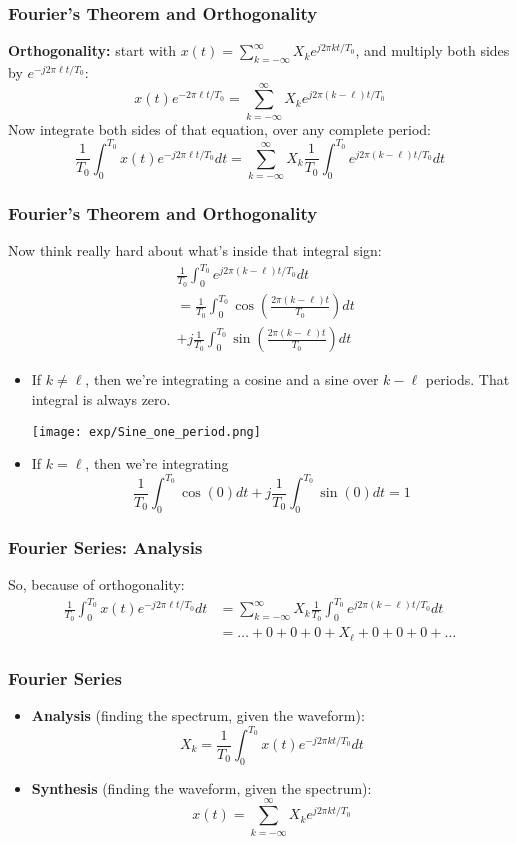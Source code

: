 \documentclass{beamer}
\begin{document}
\begin{frame}
  \frametitle{Fourier's Theorem and Orthogonality}

  {\bf Orthogonality:} start with $x(t) = \sum_{k=-\infty}^\infty X_k
  e^{j2\pi kt/T_0}$, and multiply both sides by $e^{-j2\pi \ell
    t/T_0}$:
  \[
  x(t)e^{-2\pi\ell t/T_0} = \sum_{k=-\infty}^\infty X_k e^{j2\pi (k-\ell)t/T_0}
  \]
  Now integrate both sides of that equation, over any complete period:
  \[
  \frac{1}{T_0}\int_0^{T_0}x(t)e^{-j2\pi\ell t/T_0}dt =
  \sum_{k=-\infty}^\infty X_k \frac{1}{T_0}\int_0^{T_0} e^{j2\pi (k-\ell)t/T_0}dt
  \]
\end{frame}

\begin{frame}
  \frametitle{Fourier's Theorem and Orthogonality}

  Now think really hard about what's inside that integral sign:
  \begin{align*}
    &\frac{1}{T_0}\int_0^{T_0} e^{j2\pi (k-\ell)t/T_0}dt\\
    &=\frac{1}{T_0}\int_0^{T_0}\cos\left(\frac{2\pi(k-\ell)t}{T_0}\right)dt\\
    &+j\frac{1}{T_0}\int_0^{T_0}\sin\left(\frac{2\pi (k-\ell)t}{T_0}\right)dt
  \end{align*}
  \begin{itemize}
  \item If $k\ne\ell$, then we're integrating a cosine and a sine over
    $k-\ell$ periods.  That integral is always zero.
    \centerline{\texttt{[image: exp/Sine\_one\_period.png]}}
  \item If $k=\ell$, then we're integrating
    \[
    \frac{1}{T_0}\int_0^{T_0}\cos(0)dt+
    j\frac{1}{T_0}\int_0^{T_0}\sin(0)dt = 1
    \]
  \end{itemize}
\end{frame}

\begin{frame}
  \frametitle{Fourier Series: Analysis}

  So, because of orthogonality:
  \begin{align*}
  \frac{1}{T_0}\int_0^{T_0}x(t)e^{-j2\pi\ell t/T_0}dt &=
  \sum_{k=-\infty}^\infty X_k \frac{1}{T_0}\int_0^{T_0} e^{j2\pi (k-\ell)t/T_0}dt\\
  &= \ldots + 0 + 0 + 0 + X_\ell + 0 +0 + 0 + \ldots
  \end{align*}
  
\end{frame}  

\begin{frame}
  \frametitle{Fourier Series}

  \begin{itemize}
  \item {\bf Analysis}  (finding the spectrum, given the waveform):
    \[
    X_k = \frac{1}{T_0}\int_0^{T_0} x(t)e^{-j2\pi kt/T_0}dt
    \]
  \item {\bf Synthesis} (finding the waveform, given the spectrum):
    \[
    x(t) = \sum_{k=-\infty}^\infty X_k e^{j2\pi kt/T_0}
    \]
  \end{itemize}
  
\end{frame}  
\end{document}
